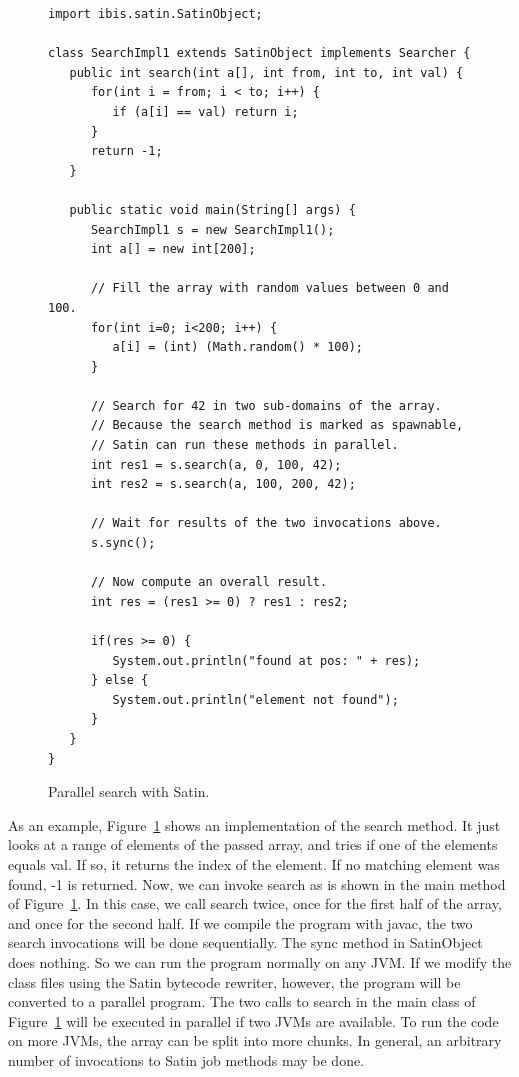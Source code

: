 \documentclass[10pt]{article}
\begin{document}
\begin{figure}[t!]
{\small
\begin{verbatim}
import ibis.satin.SatinObject;

class SearchImpl1 extends SatinObject implements Searcher {
   public int search(int a[], int from, int to, int val) {
      for(int i = from; i < to; i++) {
         if (a[i] == val) return i;
      }
      return -1;
   }

   public static void main(String[] args) {
      SearchImpl1 s = new SearchImpl1();
      int a[] = new int[200];

      // Fill the array with random values between 0 and 100.
      for(int i=0; i<200; i++) {
         a[i] = (int) (Math.random() * 100);
      }

      // Search for 42 in two sub-domains of the array.
      // Because the search method is marked as spawnable,
      // Satin can run these methods in parallel.
      int res1 = s.search(a, 0, 100, 42);
      int res2 = s.search(a, 100, 200, 42);

      // Wait for results of the two invocations above.
      s.sync();

      // Now compute an overall result.
      int res = (res1 >= 0) ? res1 : res2;

      if(res >= 0) {
         System.out.println("found at pos: " + res);
      } else {
         System.out.println("element not found");
      }
   }
}
\end{verbatim}
}
\caption{Parallel search with Satin.}
\label{satin-search-fig}
\end{figure}

As an example, Figure~\ref{satin-search-fig} shows an implementation of the search
method. It just looks at a range of elements of the passed array, and
tries if one of the elements equals val. If so, it returns the index
of the element. If no matching element was found, -1 is returned.
Now, we can invoke search as is shown in the main method of Figure~\ref{satin-search-fig}.
In this case, we call search twice, once for the first half of the
array, and once for the second half. If we compile the program with
javac, the two search invocations will be done sequentially. The sync
method in SatinObject does nothing. So we can run the program normally
on any JVM.  If we modify the class files using the Satin bytecode
rewriter, however, the program will be converted to a parallel
program.  The two calls to search in the main class of Figure~\ref{satin-search-fig} will
be executed in parallel if two JVMs are available. To run the code on
more JVMs, the array can be split into more chunks. In general, an
arbitrary number of invocations to Satin job methods may be done.
\end{document}
